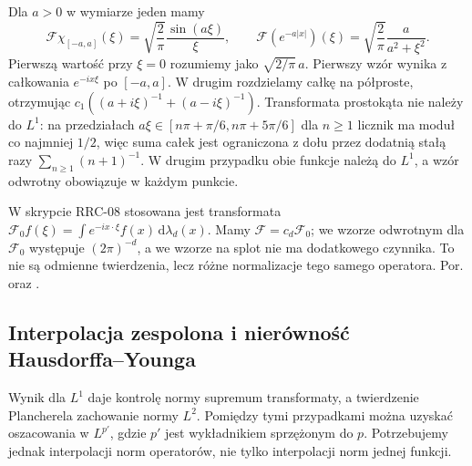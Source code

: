 \begin{przyklad}
\label{ex:dt-fourier-l1-pairs}
Dla $a>0$ w wymiarze jeden mamy
\[
 \mathcal F\chi_{[-a,a]}(\xi)
 =\sqrt{\frac{2}{\pi}}\frac{\sin(a\xi)}{\xi},
 \qquad
 \mathcal F(e^{-a|x|})(\xi)
 =\sqrt{\frac{2}{\pi}}\frac{a}{a^2+\xi^2}.
\]
Pierwszą wartość przy $\xi=0$ rozumiemy jako
$\sqrt{2/\pi}\,a$. Pierwszy wzór wynika z całkowania
$e^{-ix\xi}$ po $[-a,a]$. W drugim rozdzielamy całkę
na półproste, otrzymując
$c_1((a+i\xi)^{-1}+(a-i\xi)^{-1})$.
Transformata prostokąta nie należy do $L^1$: na
przedziałach $a\xi\in[n\pi+\pi/6,n\pi+5\pi/6]$
dla $n\ge1$ licznik ma moduł co najmniej $1/2$,
więc suma całek jest ograniczona z dołu przez
dodatnią stałą razy $\sum_{n\ge1}(n+1)^{-1}$.
W drugim przypadku obie funkcje należą do $L^1$,
a wzór odwrotny obowiązuje w każdym punkcie.
\end{przyklad}

\begin{uwaga}
\label{rem:dt-fourier-normalization-rrc}
W skrypcie RRC-08 stosowana jest transformata
$\mathcal F_0f(\xi)=\int e^{-ix\cdot\xi}f(x)
\,\mathrm d\lambda_d(x)$. Mamy $\mathcal F=c_d\mathcal F_0$;
we wzorze odwrotnym dla $\mathcal F_0$ występuje
$(2\pi)^{-d}$, a we wzorze na splot nie ma dodatkowego
czynnika. To nie są odmienne twierdzenia, lecz różne
normalizacje tego samego operatora. Por.
oraz
.
\end{uwaga}

\subsection{Interpolacja zespolona i nierówność Hausdorffa--Younga}

Wynik dla $L^1$ daje kontrolę normy supremum transformaty,
a twierdzenie Plancherela zachowanie normy $L^2$.
Pomiędzy tymi przypadkami można uzyskać oszacowania w
$L^{p'}$, gdzie $p'$ jest wykładnikiem sprzężonym do $p$.
Potrzebujemy jednak interpolacji norm operatorów, nie tylko
interpolacji norm jednej funkcji.

